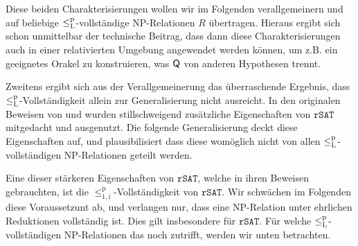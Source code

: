 Diese beiden Charakterisierungen wollen wir im Folgenden verallgemeinern und auf beliebige $\leq_\mathrm{L}^\mathrm{p}$-vollständige NP-Relationen $R$ übertragen. 
Hieraus ergibt sich schon unmittelbar der technische Beitrag, dass dann diese Charakterisierungen auch in einer relativierten Umgebung angewendet werden können, um z.B. ein geeignetes Orakel zu konstruieren, was $\mathsf{Q}$ von anderen Hypothesen trennt.

Zweitens ergibt sich aus der Verallgemeinerung das überraschende Ergebnis, dass $\leq_\mathrm{L}^\mathrm{p}$-Vollständigkeit allein zur Generalisierung nicht ausreicht. In den originalen Beweisen von \citeauthor{fenner_inverting_2003} und \citeauthor{messner_simulation_2001} wurden stillschweigend zusätzliche Eigenschaften von $\mathtt{rSAT}$ mitgedacht und ausgenutzt. Die folgende Generalisierung deckt diese Eigenschaften auf, und plausibilisiert dass diese womöglich nicht von allen $\leq_\mathrm{L}^\mathrm{p}$-vollständigen NP-Relationen geteilt werden.

Eine dieser stärkeren Eigenschaften von $\mathtt{rSAT}$, welche \citeauthor{fenner_inverting_2003} in ihren Beweisen gebrauchten, ist die $\leq_\mathrm{1,i}^\mathrm p$-Vollständigkeit von $\mathtt{rSAT}$. Wir schwächen im Folgenden diese Voraussetzunt ab, und verlangen nur, dass eine NP-Relation unter ehrlichen Reduktionen vollständig ist. Dies gilt insbesondere für $\mathtt{rSAT}$.
Für welche $\leq_\mathrm{L}^\mathrm{p}$-vollständigen NP-Relationen das noch zutrifft, werden wir unten betrachten.

